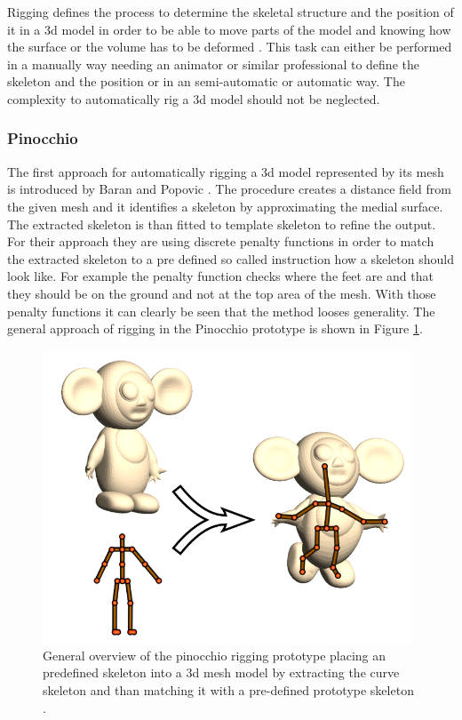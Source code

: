 Rigging defines the process to determine the skeletal structure and the position of it in a \gls{3d} model in order to be able to move parts of the model and knowing how the surface or the volume has to be deformed \cite{Baran2007}. This task can either be performed in a manually way needing an animator or similar professional to define the skeleton and the position or in an semi-automatic or automatic way. The complexity to automatically rig a \gls{3d} model should not be neglected.

\subsubsection{Pinocchio}
The first approach for automatically rigging a \gls{3d} model represented by its mesh is introduced by Baran and Popovic \cite{Baran2007}. The procedure creates a distance field from the given mesh and it identifies a skeleton by approximating the medial surface. The extracted skeleton is than fitted to template skeleton to refine the output. For their approach they are using discrete penalty functions in order to match the extracted skeleton to a pre defined so called instruction how a skeleton should look like. For example the penalty function checks where the feet are and that they should be on the ground and not at the top area of the mesh. With those penalty functions it can clearly be seen that the method looses generality. The general approach of rigging in the Pinocchio prototype is shown in Figure \ref{fig:pinocchio}.

\begin{figure} [htb!]
    \centering
	\includegraphics[width=11cm]{content/images/pinocchio}
	\caption{General overview of the pinocchio rigging prototype placing an predefined skeleton into a \gls{3d} mesh model by extracting the curve skeleton and than matching it with a pre-defined prototype skeleton \cite{Baran2007}.}
	\label{fig:pinocchio}
\end{figure}

